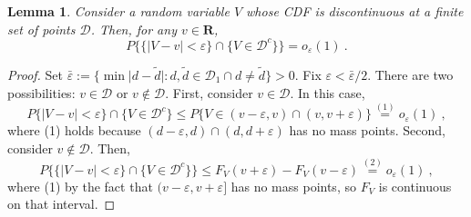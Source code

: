 \documentclass[11pt]{article}
\numberwithin{equation}{section}
\newtheorem{lemma}{Lemma}%
\begin{document}
\begin{lemma}\label{lem:aux_lemma3} 
Consider a random variable $V$ whose CDF is discontinuous at a finite set of points $\mathcal{D}$. Then, for any $v\in \mathbf{R}$,
\begin{equation*}
P\{ \{ |V-v|<\varepsilon \} \cap \{V\in \mathcal{D}^{c}\}\} =o_{\varepsilon}(1)~.
\end{equation*}
\end{lemma}
\begin{proof}
Set $\bar{\varepsilon}:=\{ \min \vert d-\tilde{d}\vert :d,\tilde{d}\in \mathcal{D}_{1}\cap d\not=\tilde{d}\} >0$. Fix $\varepsilon <\bar{\varepsilon}/2$. There are two possibilities: $v\in \mathcal{D}$ or $v\not\in \mathcal{D}$. First, consider $v\in \mathcal{D}$. In this case,
\begin{equation*}
P\{ |V-v|<\varepsilon \} \cap \{V\in \mathcal{D}^{c}\} \leq P\{ V\in ( v-\varepsilon ,v) \cap ( v,v+\varepsilon ) \} \overset{(1)}{=}  o_{\varepsilon}(1)~,
\end{equation*}
where (1) holds because $(d-\varepsilon ,d)\cap (d,d+\varepsilon )$ has no mass points. Second, consider $ v\not\in \mathcal{D}$.  Then,
\begin{equation*}
P\{ \{ |V-v|<\varepsilon \} \cap \{V\in \mathcal{D} ^{c}\}\} \leq F_{V}(v+\varepsilon )-F_{V}(v-\varepsilon )\overset{(2)}{=} o_{\varepsilon }(1)~ ,
\end{equation*}
where (1) by the fact that $( v-\varepsilon ,v+\varepsilon ] $ has no mass points, so $F_{V}$ is continuous on that interval.
\end{proof}
\end{document}
